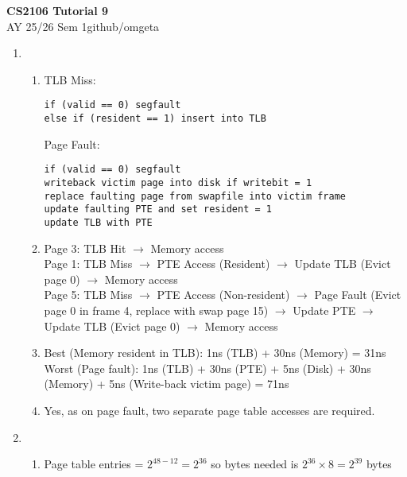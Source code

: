 \documentclass[12pt, a4paper]{article}
\newcommand{\mytitle}{CS2106 Tutorial 9}
\newcommand{\myauthor}{github/omgeta}
\newcommand{\mydate}{AY 25/26 Sem 1}
\begin{document}
\raggedright
\footnotesize
\begin{center}
{\normalsize{\textbf{\mytitle}}} \\
{\footnotesize{\mydate\hspace{2pt}\textemdash\hspace{2pt}\myauthor}}
\end{center}
\begin{enumerate}[Q\arabic*.]
  \item
    \begin{enumerate}[(\alph*.)]
      \item TLB Miss:
        \begin{lstlisting}
if (valid == 0) segfault
else if (resident == 1) insert into TLB
        \end{lstlisting}

        Page Fault:
        \begin{lstlisting}
if (valid == 0) segfault
writeback victim page into disk if writebit = 1
replace faulting page from swapfile into victim frame
update faulting PTE and set resident = 1
update TLB with PTE
        \end{lstlisting}

      \item Page 3: TLB Hit $\rightarrow$ Memory access\\
        Page 1: TLB Miss $\rightarrow$ PTE Access (Resident) $\rightarrow$ Update TLB (Evict page 0) $\rightarrow$ Memory access\\
        Page 5: TLB Miss $\rightarrow$ PTE Access (Non-resident) $\rightarrow$ Page Fault (Evict page 0 in frame 4, replace with swap page 15) $\rightarrow$ Update PTE $\rightarrow$ Update TLB (Evict page 0) $\rightarrow$ Memory access

      \item Best (Memory resident in TLB): 1ns (TLB) + 30ns (Memory) = 31ns\\
        Worst (Page fault): 1ns (TLB) + 30ns (PTE) + 5ns (Disk) + 30ns (Memory) + 5ns (Write-back victim page) = 71ns

      \item Yes, as on page fault, two separate page table accesses are required.
    \end{enumerate}

  \item
    \begin{enumerate}[(\alph*.)]
      \item Page table entries = $2^{48 - 12} = 2^36$ so bytes needed is $2^36 \times 8 = 2^39$ bytes


\end{enumerate}
\end{enumerate}
\end{document}
